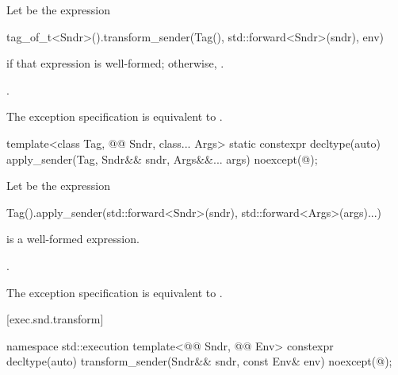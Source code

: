\begin{itemdescr}
\pnum
Let  be the expression
\begin{codeblock}
tag_of_t<Sndr>().transform_sender(Tag(), std::forward<Sndr>(sndr), env)
\end{codeblock}
if that expression is well-formed;
otherwise, .

\pnum
\returns
{}.

\pnum
\remarks
The exception specification is equivalent to .
\end{itemdescr}

%
\begin{itemdecl}
template<class Tag, @@ Sndr, class... Args>
  static constexpr decltype(auto) apply_sender(Tag, Sndr&& sndr, Args&&... args)
    noexcept(@\seebelow@);
\end{itemdecl}

\begin{itemdescr}
\pnum
Let  be the expression
\begin{codeblock}
  Tag().apply_sender(std::forward<Sndr>(sndr), std::forward<Args>(args)...)
\end{codeblock}

\pnum
\constraints
{} is a well-formed expression.

\pnum
\returns
{}.

\pnum
\remarks
The exception specification is equivalent to .
\end{itemdescr}

[exec.snd.transform]{}

%
\begin{itemdecl}
namespace std::execution {
  template<@@ Sndr, @@ Env>
    constexpr decltype(auto) transform_sender(Sndr&& sndr, const Env& env)
      noexcept(@\seebelow@);
}
\end{itemdecl}

